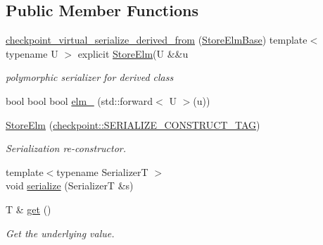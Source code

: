 \subsection*{Public Member Functions}
\begin{DoxyCompactItemize}
\item 
\hyperlink{structvt_1_1vrt_1_1collection_1_1storage_1_1_store_elm_3_01_t_00_01typename_01std_1_1enable__if_947e0655769addb625fb511f777768bd_a594cc389e2453269fd32cce7ff3b48a7}{checkpoint\+\_\+virtual\+\_\+serialize\+\_\+derived\+\_\+from} (\hyperlink{structvt_1_1vrt_1_1collection_1_1storage_1_1_store_elm_base}{Store\+Elm\+Base}) template$<$ typename U $>$ explicit \hyperlink{structvt_1_1vrt_1_1collection_1_1storage_1_1_store_elm}{Store\+Elm}(U \&\&u
\begin{DoxyCompactList}\small\item\em polymorphic serializer for derived class \end{DoxyCompactList}\item 
bool bool bool \hyperlink{structvt_1_1vrt_1_1collection_1_1storage_1_1_store_elm_3_01_t_00_01typename_01std_1_1enable__if_947e0655769addb625fb511f777768bd_a0c699578a1c07f7c948d603df0550715}{elm\+\_\+} (std\+::forward$<$ U $>$(u))
\item 
\hyperlink{structvt_1_1vrt_1_1collection_1_1storage_1_1_store_elm_3_01_t_00_01typename_01std_1_1enable__if_947e0655769addb625fb511f777768bd_ad8dfd05ce5b4a6937906fce29733ac37}{Store\+Elm} (\hyperlink{namespacecheckpoint_a7ff642cff4d72d01a16ab10e9bc363ef}{checkpoint\+::\+S\+E\+R\+I\+A\+L\+I\+Z\+E\+\_\+\+C\+O\+N\+S\+T\+R\+U\+C\+T\+\_\+\+T\+AG})
\begin{DoxyCompactList}\small\item\em Serialization re-\/constructor. \end{DoxyCompactList}\item 
{\footnotesize template$<$typename SerializerT $>$ }\\void \hyperlink{structvt_1_1vrt_1_1collection_1_1storage_1_1_store_elm_3_01_t_00_01typename_01std_1_1enable__if_947e0655769addb625fb511f777768bd_ae4824f71a4909c65fab811ef7b97f9aa}{serialize} (SerializerT \&s)
\item 
T \& \hyperlink{structvt_1_1vrt_1_1collection_1_1storage_1_1_store_elm_3_01_t_00_01typename_01std_1_1enable__if_947e0655769addb625fb511f777768bd_aca0afee85781dbc7e76c3dff59ab4136}{get} ()
\begin{DoxyCompactList}\small\item\em Get the underlying value. \end{DoxyCompactList}\item 

\end{DoxyCompactItemize}
